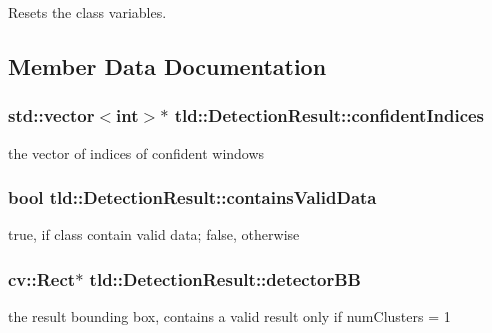 Resets the class variables. 



\subsection{Member Data Documentation}
\hypertarget{classtld_1_1DetectionResult_aae986474ad532795e262e240a3ddb951}{
\subsubsection[{confident\-Indices}]{\setlength{\rightskip}{0pt plus 5cm}std\-::vector$<$int$>$$\ast$ tld\-::\-Detection\-Result\-::confident\-Indices}}\label{classtld_1_1DetectionResult_aae986474ad532795e262e240a3ddb951}


the vector of indices of confident windows 

\hypertarget{classtld_1_1DetectionResult_af5202404b0b269bd5f8c6b483356c517}{
\subsubsection[{contains\-Valid\-Data}]{\setlength{\rightskip}{0pt plus 5cm}bool tld\-::\-Detection\-Result\-::contains\-Valid\-Data}}\label{classtld_1_1DetectionResult_af5202404b0b269bd5f8c6b483356c517}


true, if class contain valid data; false, otherwise 

\hypertarget{classtld_1_1DetectionResult_ab3cade119a99e868902e6bca2e6271df}{
\subsubsection[{detector\-B\-B}]{\setlength{\rightskip}{0pt plus 5cm}cv\-::\-Rect$\ast$ tld\-::\-Detection\-Result\-::detector\-B\-B}}\label{classtld_1_1DetectionResult_ab3cade119a99e868902e6bca2e6271df}


the result bounding box, contains a valid result only if num\-Clusters = 1 

